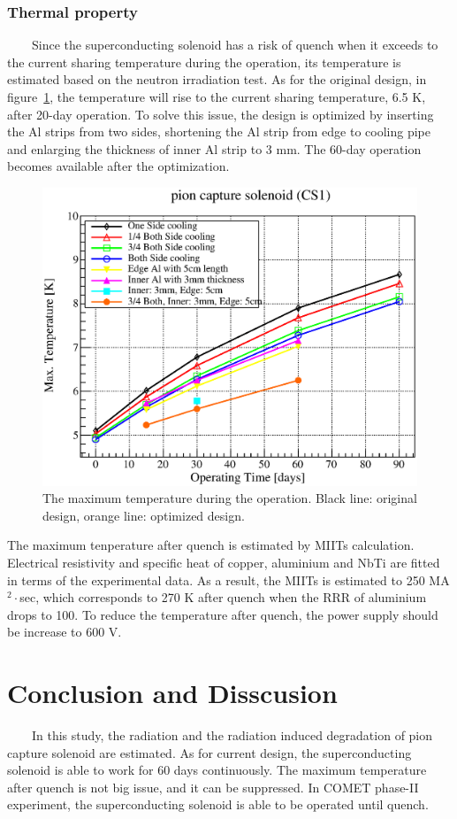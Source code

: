 \documentclass[a4paper, 10pt, twocolumn]{article}
\begin{document}
\subsubsection*{Thermal property}
~~~~Since the superconducting solenoid has a risk of quench when it exceeds to the current sharing temperature during the operation, its temperature is estimated based on the neutron irradiation test.
As for the original design, in figure~\ref{temp}, the temperature will rise to the current sharing temperature, 6.5 K, after 20-day operation.
To solve this issue, the design is optimized by inserting the Al strips from two sides, shortening the Al strip from edge to cooling pipe and enlarging the thickness of inner Al strip to 3 mm.
The 60-day operation becomes available after the optimization.
\begin{figure}[H]
 \centering
 \includegraphics[scale=0.4]{fig/maxtemp.eps}
 \caption{The maximum temperature during the operation. Black line: original design, orange line: optimized design.}
 \label{temp}
\end{figure}

The maximum tenperature after quench is estimated by MIITs calculation.
Electrical resistivity and specific heat of copper, aluminium and NbTi are fitted in terms of the experimental data.
As a result, the MIITs is estimated to 250 MA$^2\cdot$sec, which corresponds to 270 K after quench when the RRR of aluminium drops to 100.
To reduce the temperature after quench, the power supply should be increase to 600 V.

\section{Conclusion and Disscusion}
~~~~In this study, the radiation and the radiation induced degradation of pion capture solenoid are estimated.
As for current design, the superconducting solenoid is able to work for 60 days continuously.
The maximum temperature after quench is not big issue, and it can be suppressed.
In COMET phase-II experiment, the superconducting solenoid is able to be operated until quench.
\end{document}
